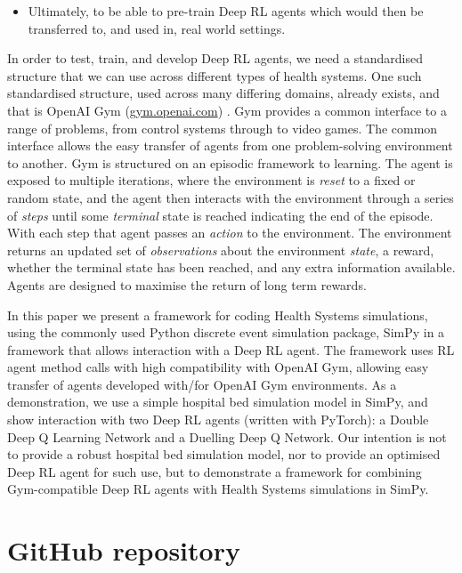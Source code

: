 \documentclass{article}
\begin{document}
\begin{multicols}{2}
\begin{itemize}
    \item Ultimately, to be able to pre-train Deep RL agents which would then be transferred to, and used in, real world settings.

\end{itemize}

In order to test, train, and develop Deep RL agents, we need a standardised structure that we can use across different types of health systems. One such standardised structure, used across many differing domains, already exists, and that is OpenAI Gym (\url{gym.openai.com}) \cite{brockman_openai_2016}. Gym provides a common interface to a range of problems, from control systems through to video games. The common interface allows the easy transfer of agents from one problem-solving environment to another. Gym is structured on an episodic framework to learning. The agent is exposed to multiple iterations, where the environment is \emph{reset} to a fixed or random state, and the agent then interacts with the environment through a series of \emph{steps} until some \emph{terminal} state is reached indicating the end of the episode. With each step that agent passes an \emph{action} to the environment. The environment returns an updated set of \emph{observations} about the environment \emph{state}, a reward, whether the terminal state has been reached, and any extra information available. Agents are designed to maximise the return of long term rewards.

In this paper we present a framework for coding Health Systems simulations, using the commonly used Python discrete event simulation package, SimPy \cite{team_simpy_simpy_2020} in a framework that allows interaction with a Deep RL agent. The framework uses RL agent method calls with high compatibility with OpenAI Gym, allowing easy transfer of agents developed with/for OpenAI Gym environments. As a demonstration, we use a simple hospital bed simulation model in SimPy, and show interaction with two Deep RL agents (written with PyTorch): a Double Deep Q Learning Network and a Duelling Deep Q Network. Our intention is not to provide a robust hospital bed simulation model, nor to provide an optimised Deep RL agent for such use, but to demonstrate a framework for combining Gym-compatible Deep RL agents with Health Systems simulations in SimPy.

\section{GitHub repository}


\end{multicols}
\end{document}
